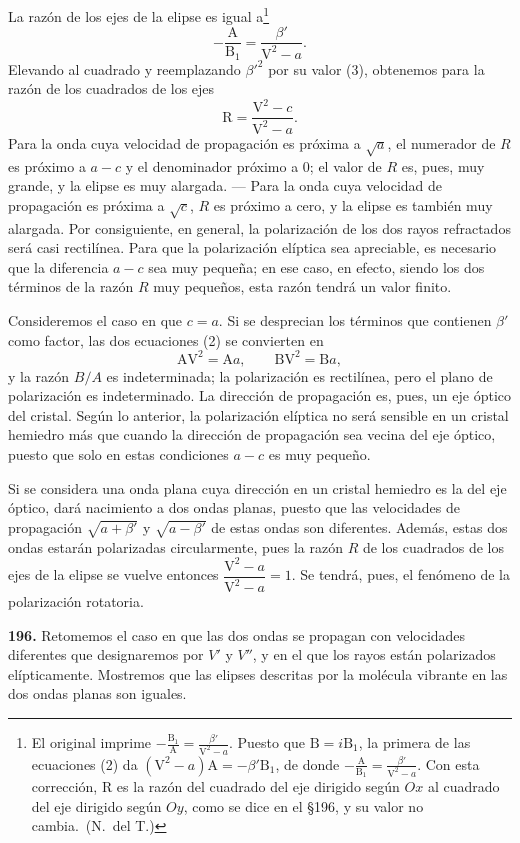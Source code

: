 La razón de los ejes de la elipse es igual a\footnote{El original
imprime $-\frac{\mathrm B_1}{\mathrm A}=\frac{\beta'}{\mathrm V^2-a}$.
Puesto que $\mathrm B=i\mathrm B_1$, la primera de las ecuaciones (2)
da $(\mathrm V^2-a)\mathrm A=-\beta'\mathrm B_1$, de donde
$-\frac{\mathrm A}{\mathrm B_1}=\frac{\beta'}{\mathrm V^2-a}$. Con esta
corrección, $\mathrm R$ es la razón del cuadrado del eje dirigido según
$Ox$ al cuadrado del eje dirigido según $Oy$, como se dice en el
§196, y su valor no cambia.~(N.~del T.)}
\[
-\frac{\mathrm A}{\mathrm B_1}=\frac{\beta'}{\mathrm V^2-a}.
\]
Elevando al cuadrado y reemplazando $\beta'^2$ por su valor (3),
obtenemos para la razón de los cuadrados de los ejes
\[
\mathrm R=\frac{\mathrm V^2-c}{\mathrm V^2-a}.
\]
Para la onda cuya velocidad de propagación es próxima a $\sqrt a$, el
numerador de $R$ es próximo a $a-c$ y el denominador próximo a $0$; el
valor de $R$ es, pues, muy grande, y la elipse es muy alargada. — Para la
onda cuya velocidad de propagación es próxima a $\sqrt c$, $R$ es próximo
a cero, y la elipse es también muy alargada. Por consiguiente, en
general, la polarización de los dos rayos refractados será casi
rectilínea. Para que la polarización elíptica sea apreciable, es
necesario que la diferencia $a-c$ sea muy pequeña; en ese caso, en
efecto, siendo los dos términos de la razón $R$ muy pequeños, esta razón
tendrá un valor finito.

Consideremos el caso en que $c=a$. Si se desprecian los términos que
contienen $\beta'$ como factor, las dos ecuaciones (2) se convierten en
\[
\mathrm{AV}^2=\mathrm Aa,\qquad \mathrm{BV}^2=\mathrm Ba,
\]
y la razón $B/A$ es indeterminada; la polarización es rectilínea, pero el
plano de polarización es indeterminado. La dirección de propagación es,
pues, un eje óptico del cristal. Según lo anterior, la polarización
elíptica no será sensible en un cristal hemiedro más que cuando la
dirección de propagación sea vecina del eje óptico, puesto que solo en
estas condiciones $a-c$ es muy pequeño.

Si se considera una onda plana cuya dirección en un cristal hemiedro es
la del eje óptico, dará nacimiento a dos ondas planas, puesto que las
velocidades de propagación $\sqrt{a+\beta'}$ y $\sqrt{a-\beta'}$ de estas
ondas son diferentes. Además, estas dos ondas estarán polarizadas
circularmente, pues la razón $R$ de los cuadrados de los ejes de la
elipse se vuelve entonces $\dfrac{\mathrm V^2-a}{\mathrm V^2-a}=1$. Se
tendrá, pues, el fenómeno de la polarización rotatoria.

\noindent\textbf{196.} Retomemos el caso en que las dos ondas se propagan
con velocidades diferentes que designaremos por $V'$ y $V''$, y en el que
los rayos están polarizados elípticamente. Mostremos que las elipses
descritas por la molécula vibrante en las dos ondas planas son iguales.

